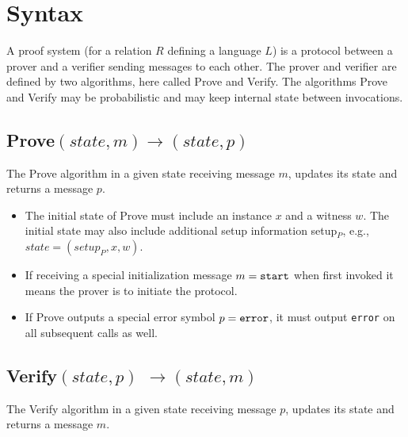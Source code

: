 \section{Syntax}
\label{security:syntax}
 
A proof system (for a relation $R$ defining a language $L$) is a protocol between a prover and a verifier sending messages to each other. 
The prover and verifier are defined by two algorithms, here called Prove and Verify. 
The algorithms Prove and Verify may be probabilistic and may keep internal state between invocations.


\subsection[Prove]{\textbf{Prove}$(state, m) \rightarrow (state, p)$}
\label{security:syntax:prove}

The Prove algorithm in a given state receiving message $m$, updates its state and returns a message $p$.\loosen

\begin{itemize}
\item The initial state of Prove must include an instance $x$ and a witness $w$. 
    The initial state may also include additional setup information setup$_P$, e.g., $state = (setup_P, x, w)$.
\item If receiving a special initialization message $m = \tt start$ when first invoked it means the prover is to initiate the protocol.
\item If Prove outputs a special error symbol $p = \tt error$, it must output {\tt error} on all subsequent calls as well.
\end{itemize}


\subsection[Verify]{\textbf{Verify}$(state, p)$ $\rightarrow (state, m)$}
\label{security:syntax:verify}

The Verify algorithm in a given state receiving message $p$, updates its state and returns a message $m$.\loosen

